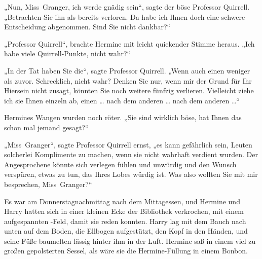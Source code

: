„Nun, Miss~Granger, ich werde gnädig sein“, sagte der böse Professor Quirrell.
„Betrachten Sie ihn als bereits verloren. Da habe ich Ihnen doch eine schwere Entscheidung abgenommen. Sind Sie nicht dankbar?“

„Professor Quirrell“, brachte Hermine mit leicht quiekender Stimme heraus.
„Ich habe viele Quirrell-Punkte, nicht wahr?“

„In der Tat haben Sie die“, sagte Professor Quirrell.
„Wenn auch einen weniger als zuvor. Schrecklich, nicht wahr? Denken Sie nur, wenn mir der Grund für Ihr Hiersein nicht zusagt, könnten Sie noch weitere fünfzig verlieren. Vielleicht ziehe ich sie Ihnen einzeln ab, einen … nach dem anderen … nach dem anderen …“

Hermines Wangen wurden noch röter.
„Sie sind wirklich böse, hat Ihnen das schon mal jemand gesagt?“

„Miss~Granger“, sagte Professor Quirrell ernst, „es kann gefährlich sein, Leuten solcherlei Komplimente zu machen, wenn sie nicht wahrhaft verdient wurden. Der Angesprochene könnte sich verlegen fühlen und unwürdig und den Wunsch verspüren, etwas zu tun, das Ihres Lobes würdig ist. Was also wollten Sie mit mir besprechen, Miss~Granger?“

\later

Es war am Donnerstagnachmittag nach dem Mittagessen, und Hermine und Harry hatten sich in einer kleinen Ecke der Bibliothek verkrochen, mit einem aufgespannten -Feld, damit sie reden konnten. Harry lag mit dem Bauch nach unten auf dem Boden, die Ellbogen aufgestützt, den Kopf in den Händen, und seine Füße baumelten lässig hinter ihm in der Luft. Hermine saß in einem viel zu großen gepolsterten Sessel, als wäre sie die Hermine-Füllung in einem Bonbon.

